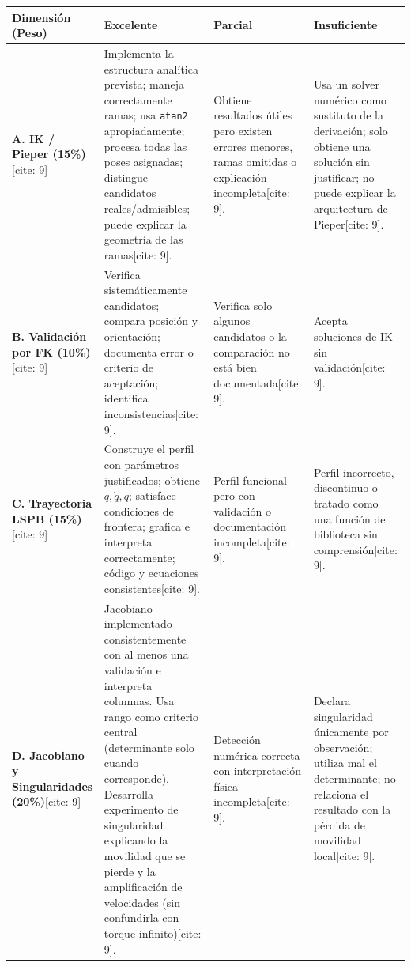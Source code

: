 \documentclass[11pt, a4paper, landscape]{article}
\begin{document}
\begin{center}
\small
\renewcommand{\arraystretch}{1.3}
\begin{tabularx}{\textwidth}{|>{\hsize=0.7\hsize\raggedright\arraybackslash}X|>{\hsize=1.1\hsize\raggedright\arraybackslash}X|>{\hsize=1.1\hsize\raggedright\arraybackslash}X|>{\hsize=1.1\hsize\raggedright\arraybackslash}X|}
\hline
\rowcolor{ucbblue!10} \textbf{Dimensión (Peso)} & \textbf{Excelente} & \textbf{Parcial} & \textbf{Insuficiente} \\ \hline

\textbf{A. IK / Pieper (15\%)}[cite: 9] & 
Implementa la estructura analítica prevista; maneja correctamente ramas; usa \texttt{atan2} apropiadamente; procesa todas las poses asignadas; distingue candidatos reales/admisibles; puede explicar la geometría de las ramas[cite: 9]. & 
Obtiene resultados útiles pero existen errores menores, ramas omitidas o explicación incompleta[cite: 9]. & 
Usa un solver numérico como sustituto de la derivación; solo obtiene una solución sin justificar; no puede explicar la arquitectura de Pieper[cite: 9]. \\ \hline

\textbf{B. Validación por FK (10\%)}[cite: 9] & 
Verifica sistemáticamente candidatos; compara posición y orientación; documenta error o criterio de aceptación; identifica inconsistencias[cite: 9]. & 
Verifica solo algunos candidatos o la comparación no está bien documentada[cite: 9]. & 
Acepta soluciones de IK sin validación[cite: 9]. \\ \hline

\textbf{C. Trayectoria LSPB (15\%)}[cite: 9] & 
Construye el perfil con parámetros justificados; obtiene $q, \dot{q}, \ddot{q}$; satisface condiciones de frontera; grafica e interpreta correctamente; código y ecuaciones consistentes[cite: 9]. & 
Perfil funcional pero con validación o documentación incompleta[cite: 9]. & 
Perfil incorrecto, discontinuo o tratado como una función de biblioteca sin comprensión[cite: 9]. \\ \hline

\textbf{D. Jacobiano y Singularidades (20\%)}[cite: 9] & 
Jacobiano implementado consistentemente con al menos una validación e interpreta columnas. Usa rango como criterio central (determinante solo cuando corresponde). Desarrolla experimento de singularidad explicando la movilidad que se pierde y la amplificación de velocidades (sin confundirla con torque infinito)[cite: 9]. & 
Detección numérica correcta con interpretación física incompleta[cite: 9]. & 
Declara singularidad únicamente por observación; utiliza mal el determinante; no relaciona el resultado con la pérdida de movilidad local[cite: 9]. \\ \hline


\end{tabularx}
\end{center}
\end{document}
